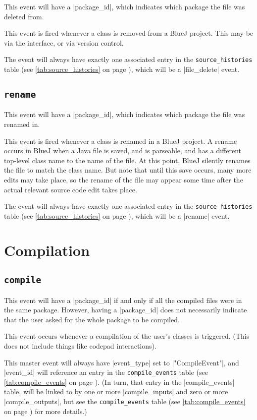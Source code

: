 \documentclass{book}
\newcommand{\myref}[1]{\autoref{#1} on page \pageref*{#1}}
\newcommand{\tabref}[1]{\lstinline|#1| table (see \myref{tab:#1})}
\begin{document}
This event will have a |package_id|, which indicates which package the file
was deleted from.

This event is fired whenever a class is removed from a BlueJ project.  This
may be via the interface, or via version control.

The event will always have exactly one associated entry in the
\tabref{source_histories}, which will be a |file_delete| event.

\subsection{\lstinline|rename|}

This event will have a |package_id|, which indicates which package the file
was renamed in.

This event is fired whenever a class is renamed in a BlueJ project.  A rename
occurs in BlueJ when a Java file is saved, and is parseable, and has a
different top-level class name to the name of the file.  At this point, BlueJ
silently renames the file to match the class name.  But note that until this
save occurs, many more edits may take place, so the rename of the file may
appear some time after the actual relevant source code edit takes place.

The event will always have exactly one associated entry in the
\tabref{source_histories}, which will be a |rename| event.

\section{Compilation}

\subsection{\lstinline|compile|}

This event will have a |package_id| if and only if all the compiled files were
in the same package.  However, having a |package_id| does not necessarily
indicate that the user asked for the whole package to be compiled.

This event occurs whenever a compilation of the user's classes is triggered.
(This does not include things like codepad interactions).

This master event will always have |event_type| set to |"CompileEvent"|, and
|event_id| will reference an entry in the \tabref{compile_events}.  (In turn,
that entry in the |compile_events| table, will be linked to by one or more
|compile_inputs| and zero or more |compile_outputs|, but see the
\tabref{compile_events} for more details.)
\end{document}
